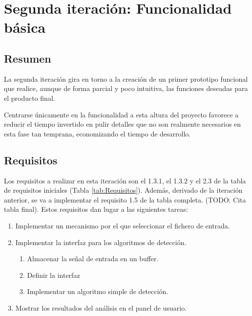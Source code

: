 
\section{Segunda iteración: Funcionalidad básica}
    \subsection{Resumen}
        La segunda iteración gira en torno a la creación de un primer prototipo funcional que realice, aunque de forma parcial y poco intuitiva, las funciones deseadas para el producto final.

        Centrarse únicamente en la funcionalidad a esta altura del proyecto favorece a reducir el tiempo invertido en pulir detalles que no son realmente necesarios en esta fase tan temprana, economizando el tiempo de desarrollo.

    \subsection{Requisitos}
        Los requisitos a realizar en esta iteración son el 1.3.1, el 1.3.2 y el 2.3 de la tabla de requisitos iniciales (Tabla \ref{tab:Requisitos}). Además, derivado de la iteración anterior, se va a implementar el requisito 1.5 de la tabla completa. (TODO: Cita tabla final). Estos requisitos dan lugar a las siguientes tareas:
    
        \begin{enumerate}
            \item Implementar un mecanismo por el que seleccionar el fichero de entrada.
            \item Implementar la interfaz para los algoritmos de detección.
            \begin{enumerate}
                \item Almacenar la señal de entrada en un buffer.
                \item Definir la interfaz
                \item Implementar un algoritmo simple de detección.
            \end{enumerate}
            \item Mostrar los resultados del análisis en el panel de usuario.
        \end{enumerate}
        
